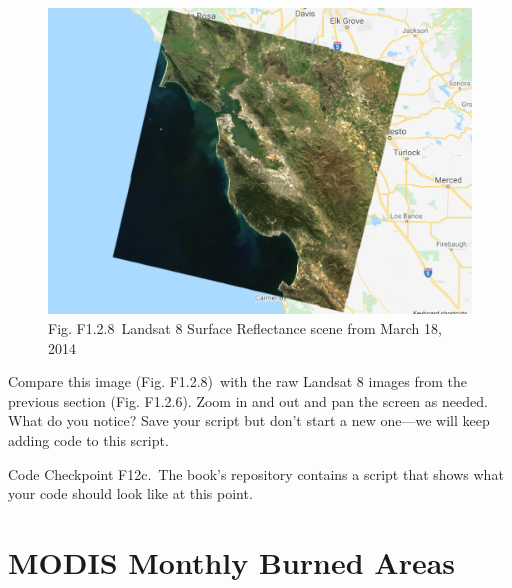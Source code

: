 \documentclass[
  letterpaper,
  DIV=11,
  numbers=noendperiod]{scrreprt}
\begin{document}
\begin{figure}

{\centering \includegraphics{./F1/image15.png}

}

\caption{Fig. F1.2.8~Landsat 8 Surface Reflectance scene from March 18,
2014}

\end{figure}

Compare this image (Fig. F1.2.8)~with the raw Landsat 8 images from the
previous section (Fig. F1.2.6). Zoom in and out and pan the screen as
needed. What do you notice? Save your script but don't start a new
one---we will keep adding code to this script.

\begin{tcolorbox}[enhanced jigsaw, left=2mm, breakable, rightrule=.15mm, opacityback=0, colframe=quarto-callout-note-color-frame, colbacktitle=quarto-callout-note-color!10!white, arc=.35mm, opacitybacktitle=0.6, toptitle=1mm, colback=white, leftrule=.75mm, title=\textcolor{quarto-callout-note-color}{\faInfo}\hspace{0.5em}{Note}, toprule=.15mm, bottomtitle=1mm, titlerule=0mm, bottomrule=.15mm, coltitle=black]

Code Checkpoint F12c.~The book's repository contains a script that shows
what your code should look like at this point.

\end{tcolorbox}

\hypertarget{modis-monthly-burned-areas}{%
\section{MODIS Monthly Burned Areas}\label{modis-monthly-burned-areas}}
\end{document}
